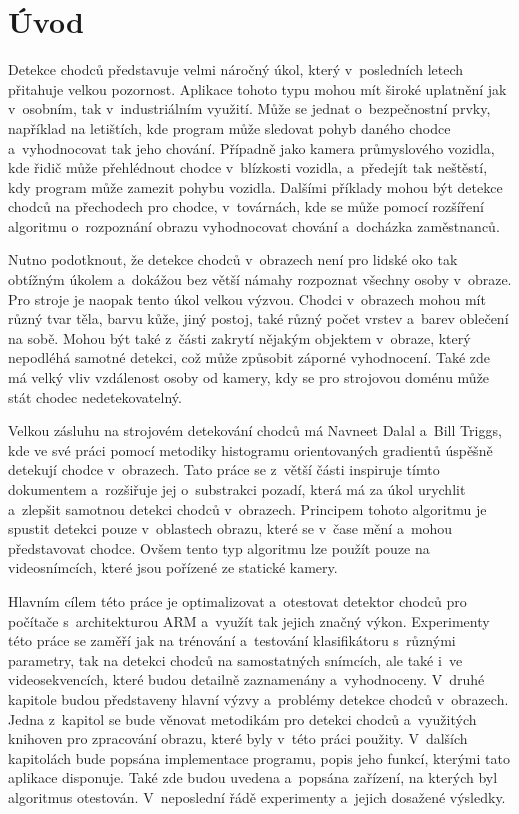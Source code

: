 \section{Úvod}
Detekce chodců představuje velmi náročný úkol, který v~posledních letech přitahuje velkou pozornost. 
Aplikace tohoto typu mohou mít široké uplatnění jak v~osobním, tak v~industriálním využití. Může se jednat o~bezpečnostní prvky, například na letištích, kde program může sledovat pohyb daného chodce a~vyhodnocovat tak jeho chování. Případně jako kamera průmyslového vozidla, kde řidič může přehlédnout chodce v~blízkosti vozidla, a~předejít tak neštěstí, kdy program může zamezit pohybu vozidla. Dalšími příklady mohou být detekce chodců na přechodech pro chodce, v~továrnách, kde se může pomocí rozšíření algoritmu o~rozpoznání obrazu vyhodnocovat chování a~docházka zaměstnanců. 

Nutno podotknout, že detekce chodců v~obrazech není pro lidské oko tak obtížným úkolem a~dokážou bez větší námahy rozpoznat všechny osoby v~obraze. Pro stroje je naopak tento úkol velkou výzvou. Chodci v~obrazech mohou mít různý tvar těla, barvu kůže, jiný postoj, také různý počet vrstev a~barev oblečení na sobě. Mohou být také z~části zakrytí nějakým objektem v~obraze, který nepodléhá samotné detekci, což může způsobit záporné vyhodnocení. Také zde má velký vliv vzdálenost osoby od kamery, kdy se pro strojovou doménu může stát chodec nedetekovatelný. 

Velkou zásluhu na strojovém detekování chodců má Navneet Dalal a~Bill Triggs, kde ve své práci \cite{hog:dalal} pomocí metodiky histogramu orientovaných gradientů úspěšně detekují chodce v~obrazech. Tato práce se z~větší části inspiruje tímto dokumentem a~rozšiřuje jej o~substrakci pozadí, která má za úkol urychlit a~zlepšit samotnou detekci chodců v~obrazech. Principem tohoto algoritmu je spustit detekci pouze v~oblastech obrazu, které se v~čase mění a~mohou představovat chodce. Ovšem tento typ algoritmu lze použít pouze na videosnímcích, které jsou pořízené ze statické kamery.

Hlavním cílem této práce je optimalizovat a~otestovat detektor chodců pro počítače s~architekturou ARM a~využít tak jejich značný výkon. 
Experimenty této práce se zaměří jak na trénování a~testování klasifikátoru s~různými parametry, tak na detekci chodců na samostatných snímcích, ale také i~ve videosekvencích, které budou detailně zaznamenány a~vyhodnoceny. 
V~druhé kapitole budou představeny hlavní výzvy a~problémy detekce chodců v~obrazech.
Jedna z~kapitol se bude věnovat metodikám pro detekci chodců a~využitých knihoven pro zpracování obrazu, které byly v~této práci použity.
V~dalších kapitolách bude popsána implementace programu, popis jeho funkcí, kterými tato aplikace disponuje. Také zde budou uvedena a~popsána zařízení, na kterých byl algoritmus otestován. V~neposlední řádě experimenty a~jejich dosažené výsledky.